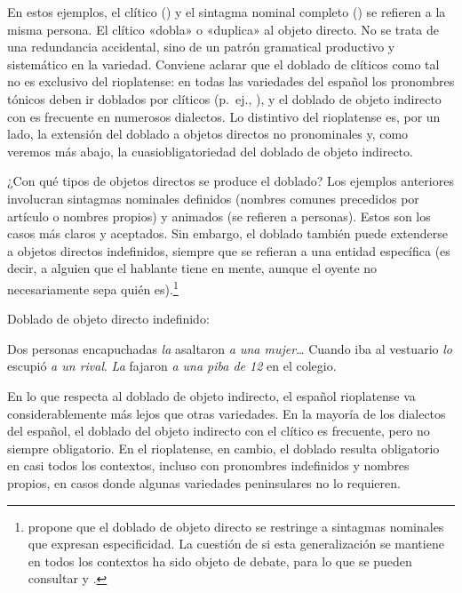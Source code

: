 En estos ejemplos, el clítico () y el sintagma nominal completo
() se refieren a la misma persona. El clítico «dobla» o
«duplica» al objeto directo. No se trata de una redundancia accidental, sino de un
patrón gramatical productivo y sistemático en la variedad. Conviene aclarar que el
doblado de clíticos como tal no es exclusivo del rioplatense: en todas las
variedades del español los pronombres tónicos deben ir doblados por clíticos
(p.~ej., ), y el doblado de objeto indirecto con  es
frecuente en numerosos dialectos. Lo distintivo del rioplatense es, por un lado,
la extensión del doblado a objetos directos no pronominales y, como veremos más
abajo, la cuasiobligatoriedad del doblado de objeto indirecto.

¿Con qué tipos de objetos directos se produce el doblado? Los ejemplos anteriores
involucran sintagmas nominales definidos (nombres comunes precedidos por artículo
o nombres propios) y animados (se refieren a personas). Estos son los casos más
claros y aceptados. Sin embargo, el doblado también puede extenderse a objetos
directos indefinidos, siempre que se refieran a una entidad específica (es decir,
a alguien que el hablante tiene en mente, aunque el oyente no necesariamente sepa
quién es).\footnote{\textcite{suner1988} propone que el doblado de objeto directo
se restringe a sintagmas nominales que expresan especificidad. La cuestión de si
esta generalización se mantiene en todos los contextos ha sido objeto de debate,
para lo que se pueden consultar \textcite{zdrojewski2008} y
\textcite{ditullio2019}.}

\begin{exe}
  \ex\label{ex:15-indef} Doblado de objeto directo indefinido:
    \begin{xlist}
      \ex Dos personas encapuchadas \textit{la} asaltaron \textit{a una
          mujer}\ldots
      \ex Cuando iba al vestuario \textit{lo} escupió \textit{a un rival}.
      \ex \textit{La} fajaron \textit{a una piba de 12} en el colegio.
    \end{xlist}
\end{exe}

En lo que respecta al doblado de objeto indirecto, el español rioplatense va
considerablemente más lejos que otras variedades. En la mayoría de los dialectos
del español, el doblado del objeto indirecto con el clítico  es
frecuente, pero no siempre obligatorio. En el rioplatense, en cambio, el doblado
resulta obligatorio en casi todos los contextos, incluso con pronombres
indefinidos y nombres propios, en casos donde algunas variedades peninsulares no
lo requieren.


